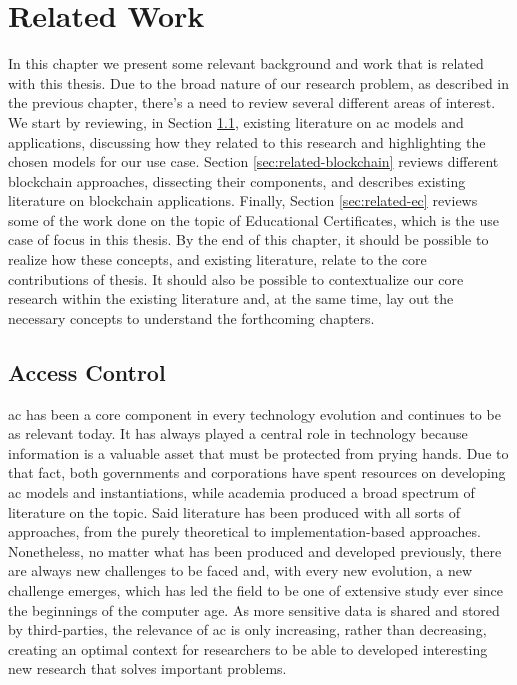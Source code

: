 \chapter{Related Work}
\label{chap:related}

In this chapter we present some relevant background and work that is related with this thesis. Due to the broad nature of our research problem, as described in the previous chapter, there's a need to review several different areas of interest. We start by reviewing, in Section \ref{sec:related-ac}, existing literature on \gls{ac} models and applications, discussing how they related to this research and highlighting the chosen models for our use case. Section \ref{sec:related-blockchain} reviews different blockchain approaches, dissecting their components, and describes existing literature on blockchain applications. Finally, Section \ref{sec:related-ec} reviews some of the work done on the topic of Educational Certificates, which is the use case of focus in this thesis. By the end of this chapter, it should be possible to realize how these concepts, and existing literature, relate to the core contributions of thesis. It should also be possible to contextualize our core research within the existing literature and, at the same time, lay out the necessary concepts to understand the forthcoming chapters.

\section{Access Control}
\label{sec:related-ac}

\glsdesc{ac} has been a core component in every technology evolution and continues to be as relevant today. It has always played a central role in technology because information is a valuable asset that must be protected from prying hands. Due to that fact, both governments and corporations have spent resources on developing \gls{ac} models and instantiations, while academia produced a broad spectrum of literature on the topic. Said literature has been produced with all sorts of approaches, from the purely theoretical to implementation-based approaches. Nonetheless, no matter what has been produced and developed previously, there are always new challenges to be faced and, with every new evolution, a new challenge emerges, which has led the field to be one of extensive study ever since the beginnings of the computer age. As more sensitive data is shared and stored by third-parties, the relevance of \gls{ac} is only increasing, rather than decreasing, creating an optimal context for researchers to be able to developed interesting new research that solves important problems.

